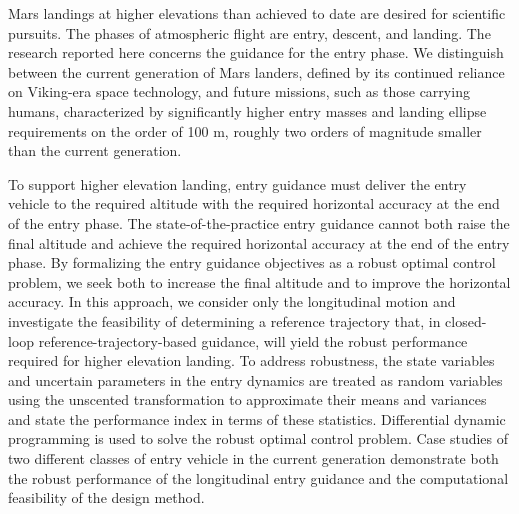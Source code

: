 \thesisabstract
{
  Mars landings at higher elevations than achieved to date are desired for scientific pursuits. The phases of atmospheric flight are entry, descent, and landing. The research reported here concerns the guidance for the entry phase. We distinguish between the current generation of Mars landers, defined by its continued reliance on Viking-era space technology, and future missions, such as those carrying humans, characterized by significantly higher entry masses and landing ellipse requirements on the order of 100 m, roughly two orders of magnitude smaller than the current generation.
  
  To support higher elevation landing, entry guidance must deliver the entry vehicle to the required altitude with the required horizontal accuracy at the end of the entry phase. The state-of-the-practice entry guidance cannot both raise the final altitude and achieve the required horizontal accuracy at the end of the entry phase. By formalizing the entry guidance objectives as a robust optimal control problem, we seek both to increase the final altitude and to improve the horizontal accuracy. In this approach, we consider only the longitudinal motion and investigate the feasibility of determining a reference trajectory that, in closed-loop reference-trajectory-based guidance, will yield the robust performance required for higher elevation landing. To address robustness, the state variables and uncertain parameters in the entry dynamics are treated as random variables using the unscented transformation to approximate their means and variances and state the performance index in terms of these statistics. Differential dynamic programming is used to solve the robust optimal control problem. Case studies of two different classes of entry vehicle in the current generation demonstrate both the robust performance of the longitudinal entry guidance and the computational feasibility of the design method.
  
}
